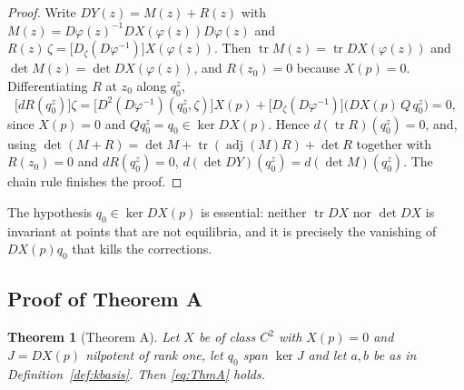 \documentclass[12pt]{article}
\theoremstyle{plain}
\newtheorem{theorem}{Theorem}[section]
\theoremstyle{definition}
\theoremstyle{remark}
\newcommand{\tr}{\operatorname{tr}}
\DeclareMathOperator{\dt}{det}
\begin{document}
	\begin{proof}
		Write $DY(z)=M(z)+R(z)$ with
		$M(z)=D\varphi(z)^{-1}DX(\varphi(z))D\varphi(z)$ and
		$R(z)\,\zeta=\bigl[D_{\zeta}(D\varphi^{-1})\bigr]X(\varphi(z))$.  Then
		$\tr M(z)=\tr DX(\varphi(z))$ and $\dt M(z)=\dt DX(\varphi(z))$, and
		$R(z_{0})=0$ because $X(p)=0$.  Differentiating $R$ at $z_{0}$ along
		$q_{0}^{z}$,
		\[
		\bigl[dR(q_{0}^{z})\bigr]\zeta
		=\bigl[D^{2}(D\varphi^{-1})(q_{0}^{z},\zeta)\bigr]X(p)
		+\bigl[D_{\zeta}(D\varphi^{-1})\bigr]\bigl(DX(p)\,Q\,q_{0}^{z}\bigr)=0 ,
		\]
		since $X(p)=0$ and $Qq_{0}^{z}=q_{0}\in\ker DX(p)$.  Hence
		$d(\tr R)(q_{0}^{z})=0$, and, using
		$\dt(M+R)=\dt M+\tr(\operatorname{adj}(M)R)+\dt R$ together with
		$R(z_{0})=0$ and $dR(q_{0}^{z})=0$,
		$d(\dt DY)(q_{0}^{z})=d(\dt M)(q_{0}^{z})$.  The chain rule finishes
		the proof.
	\end{proof}
	
	The hypothesis $q_{0}\in\ker DX(p)$ is essential: neither $\tr DX$ nor
	$\dt DX$ is invariant at points that are not equilibria, and it is
	precisely the vanishing of $DX(p)q_{0}$ that kills the corrections.
	
	\subsection{Proof of Theorem A}
	
	\begin{theorem}[Theorem A]\label{thm:A}
		Let $X$ be of class $C^{2}$ with $X(p)=0$ and $J=DX(p)$ nilpotent of
		rank one, let $q_{0}$ span $\ker J$ and let $a,b$ be as in
		Definition~\ref{def:kbasis}.  Then \eqref{eq:ThmA} holds.
	\end{theorem}
	
\end{document}
